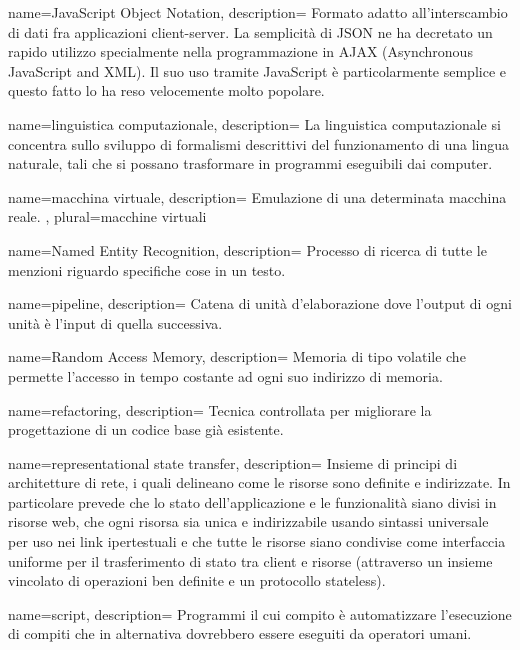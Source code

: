  {
name=JavaScript Object Notation,
description={
Formato adatto all’interscambio di dati fra applicazioni client-server. La
semplicità di JSON ne ha decretato un rapido utilizzo specialmente nella
programmazione in AJAX (Asynchronous JavaScript and XML). Il suo uso tramite
JavaScript è particolarmente semplice e questo fatto lo ha reso velocemente
molto popolare.
}
}

 {
name=linguistica computazionale,
description={
La linguistica computazionale si concentra sullo sviluppo di formalismi
descrittivi del funzionamento di una lingua naturale, tali che si possano
trasformare in programmi eseguibili dai computer.
}
}

 {
name=macchina virtuale,
description={
Emulazione di una determinata macchina reale.
},
plural=macchine virtuali
}

 {
name=Named Entity Recognition,
description={
Processo di ricerca di tutte le menzioni riguardo specifiche cose in un testo.
}
}

 {
name=pipeline,
description={
Catena di unità d'elaborazione dove l'output di ogni unità è l'input di quella
successiva.
}
}

 {
name=Random Access Memory,
description={
Memoria di tipo volatile che permette l'accesso in tempo costante ad ogni suo
indirizzo di memoria.
}
}

 {
name=refactoring,
description={
Tecnica controllata per migliorare la progettazione di un codice base già
esistente.
}
}

 {
name=representational state transfer,
description={
Insieme di principi di architetture di rete, i quali delineano come le risorse
sono definite e indirizzate. In particolare prevede che lo stato
dell’applicazione e le funzionalità siano divisi in risorse web, che ogni
risorsa sia unica e indirizzabile usando sintassi universale per uso nei link
ipertestuali e che tutte le risorse siano condivise come interfaccia uniforme
per il trasferimento di stato tra client e risorse (attraverso un insieme
vincolato di operazioni ben definite e un protocollo stateless).
}
}

 {
name=script,
description={
Programmi il cui compito è automatizzare l'esecuzione di compiti che in
alternativa dovrebbero essere eseguiti da operatori umani.
}
}

